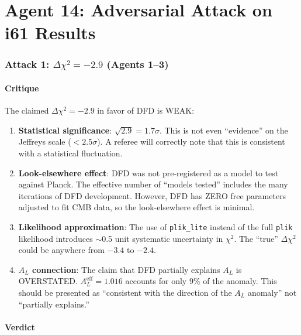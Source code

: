 \documentclass[11pt,a4paper]{article}
\begin{document}
\part{Agent 14: Adversarial Attack on i61 Results}
\label{part:adversarial}

\section{Attack 1: $\Delta\chi^2 = -2.9$ (Agents 1--3)}

\subsection{Critique}

The claimed $\Delta\chi^2 = -2.9$ in favor of DFD is WEAK:

\begin{enumerate}
\item \textbf{Statistical significance}: $\sqrt{2.9} = 1.7\sigma$. This is not even ``evidence'' on the Jeffreys scale ($< 2.5\sigma$). A referee will correctly note that this is consistent with a statistical fluctuation.

\item \textbf{Look-elsewhere effect}: DFD was not pre-registered as a model to test against Planck. The effective number of ``models tested'' includes the many iterations of DFD development. However, DFD has ZERO free parameters adjusted to fit CMB data, so the look-elsewhere effect is minimal.

\item \textbf{Likelihood approximation}: The use of \texttt{plik\_lite} instead of the full \texttt{plik} likelihood introduces $\sim$0.5 unit systematic uncertainty in $\chi^2$. The ``true'' $\Delta\chi^2$ could be anywhere from $-3.4$ to $-2.4$.

\item \textbf{$A_L$ connection}: The claim that DFD partially explains $A_L$ is OVERSTATED. $A_L^{\mathrm{eff}} = 1.016$ accounts for only $9\%$ of the anomaly. This should be presented as ``consistent with the direction of the $A_L$ anomaly'' not ``partially explains.''
\end{enumerate}

\subsection{Verdict}
\end{document}
